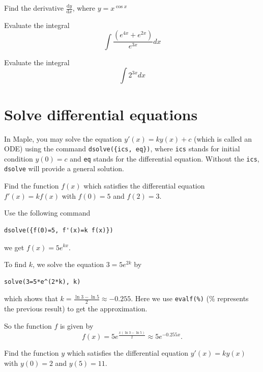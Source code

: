 \documentclass[]{book}
\theoremstyle{definition}
\theoremstyle{definition}
\theoremstyle{definition}
\theoremstyle{remark}
\let\BeginKnitrBlock\begin \let\EndKnitrBlock\end
\begin{document}
\BeginKnitrBlock{exercise}
\protect\hypertarget{exr:unnamed-chunk-11}{}{\label{exr:unnamed-chunk-11} }
Find the derivative \(\frac{\mathrm{d} y}{\mathrm{d} x}\), where
\(y=x^{\cos x}\)
\EndKnitrBlock{exercise}

\BeginKnitrBlock{exercise}
\protect\hypertarget{exr:unnamed-chunk-12}{}{\label{exr:unnamed-chunk-12} }
Evaluate the integral \[
\int \frac{\left(e^{4x}+e^{2x}\right)}{e^{3x}} d x
\]
\EndKnitrBlock{exercise}

\BeginKnitrBlock{exercise}
\protect\hypertarget{exr:unnamed-chunk-13}{}{\label{exr:unnamed-chunk-13} }
Evaluate the integral \[
\int 2^{3x} d x
\]
\EndKnitrBlock{exercise}

\chapter{Solve differential
equations}\label{solve-differential-equations}

In Maple, you may solve the equation \(y'(x)=k y(x) + c\) (which is
called an ODE) using the command \texttt{dsolve(\{ics,\ eq\})}, where
\texttt{ics} stands for initial condition \(y(0)=c\) and \texttt{eq}
stands for the differential equation. Without the \texttt{ics},
\texttt{dsolve} will provide a general solution.

\BeginKnitrBlock{example}
\protect\hypertarget{exm:unnamed-chunk-1}{}{\label{exm:unnamed-chunk-1}
}Find the function \(f(x)\) which satisfies the differential equation
\(f'(x)=k f(x)\) with \(f(0)=5\) and \(f(2)=3\).
\EndKnitrBlock{example}

\BeginKnitrBlock{solution}
{} Use the following command

\begin{verbatim}
dsolve({f(0)=5, f'(x)=k f(x)})
\end{verbatim}

we get \(f(x)=5e^{kx}\).

To find \(k\), we solve the equation \(3=5e^{2k}\) by

\begin{verbatim}
solve(3=5*e^(2*k), k)
\end{verbatim}

which shows that \(k=\frac{\ln3-\ln5}{2}\approx -0.255\). Here we use
\texttt{evalf(\%)} (\% represents the previous result) to get the
approximation.

So the function \(f\) is given by \[
f(x)=5e^{\frac{x(\ln3-\ln5)}{2}}\approx 5e^{-0.255x}.
\]
\EndKnitrBlock{solution}

\BeginKnitrBlock{exercise}
\protect\hypertarget{exr:unnamed-chunk-3}{}{\label{exr:unnamed-chunk-3} }
Find the function \(y\) which satisfies the differential equation
\(y'(x)=k y(x)\) with \(y(0)=2\) and \(y(5)=11\).
\EndKnitrBlock{exercise}
\end{document}
